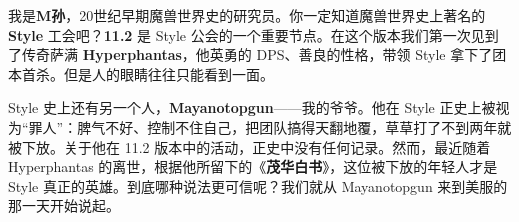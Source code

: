 \documentclass[UTF8]{ctexart}      %
\begin{document}
\noindent 我是\textbf{M孙}，20世纪早期魔兽世界史的研究员。你一定知道魔兽世界史上著名的 \textbf{Style} 工会吧？\textbf{11.2} 是 Style 公会的一个重要节点。在这个版本我们第一次见到了传奇萨满 \textbf{Hyperphantas}，他英勇的 DPS、善良的性格，带领 Style 拿下了团本首杀。但是人的眼睛往往只能看到一面。

\medskip

\noindent Style 史上还有另一个人，\textbf{Mayanotopgun}——我的爷爷。他在 Style 正史上被视为“罪人”：脾气不好、控制不住自己，把团队搞得天翻地覆，草草打了不到两年就被下放。关于他在 11.2 版本中的活动，正史中没有任何记录。然而，最近随着 Hyperphantas 的离世，根据他所留下的《\textbf{茂华白书}》，这位被下放的年轻人才是 Style 真正的英雄。到底哪种说法更可信呢？我们就从 Mayanotopgun 来到美服的那一天开始说起。
\end{document}
